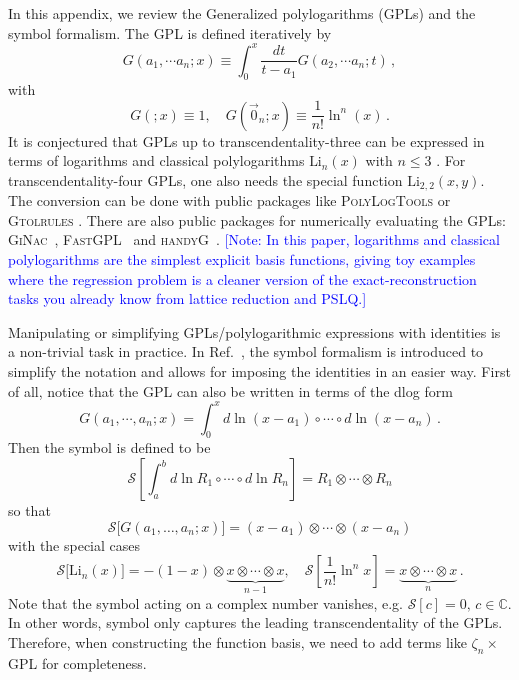 \documentclass[a4paper,11pt]{article}
\makeatletter
\def\textcolor#1#{\kg@textcolor{#1}}
\newcommand{\Li}{\text{Li}}
\newcommand{\cS}{ {\mathcal S} }
\makeatother
\begin{document}
In this appendix, we review the Generalized polylogarithms (GPLs) and the symbol formalism. The GPL is defined iteratively by 
\begin{equation}\label{eq:gpl_def}
G(a_1,\cdots a_n; x)\equiv\int_0^x \frac{dt}{t-a_1} G(a_2,\cdots a_n; t)\,,
\end{equation}
with
\begin{equation}
G(;x)\equiv1,\quad G(\vec 0_n;x)\equiv\frac{1}{n!}\ln^n (x)\,.
\end{equation}
It is conjectured that GPLs up to transcendentality-three can be expressed in terms of logarithms and classical polylogarithms $\Li_n(x)$ with $n\leq 3$ \cite{Duhr:2011zq}. For transcendentality-four GPLs, one also needs the special function $\Li_{2,2}(x,y)$. The conversion can be done with public packages like \textsc{PolyLogTools} \cite{Duhr:2019tlz} or \textsc{Gtolrules} \cite{Frellesvig:2016ske}. There are also public packages for numerically evaluating the GPLs: \textsc{GiNac}~\cite{Bauer:2002, Vollinga:2004sn}, \textsc{FastGPL}~\cite{Wang:2021imw} and \textsc{handyG}~\cite{Naterop:2019xaf}.
\textcolor{blue}{\small [Note: In this paper, logarithms and classical polylogarithms are the simplest explicit basis functions, giving toy examples where the regression problem is a cleaner version of the exact-reconstruction tasks you already know from lattice reduction and PSLQ.]}


Manipulating or simplifying GPLs/polylogarithmic expressions with identities is a non-trivial task in practice. In Ref.~\cite{Goncharov:2010jf}, the symbol formalism is introduced to simplify the notation and allows for imposing the identities in an easier way. First of all, notice that the GPL can also be written in terms of the dlog form
\begin{equation}
      G (a_1, \cdots, a_n ; x) =\int_0^x d \ln (x-a_1) \circ \cdots \circ d \ln (x-a_n) \,.
\end{equation}
Then the symbol is defined to be
\begin{equation}
    \cS\left[\int_a^b d \ln R_1  \circ \cdots \circ d \ln R_n \right]
    =R_1 \otimes \cdots \otimes R_n
\end{equation}
so that
\begin{equation}\label{symbolpolylogs}
  \cS\big[G(a_1,\ldots,a_n;x)\big] = (x-a_1) \otimes \cdots \otimes (x-a_n)
\end{equation}
with the special cases
\begin{equation}\label{symbolpolylogs2}
  \cS\big[\Li_n (x)\big] = - (1 - x) \otimes \underbrace{x \otimes
  \cdots \otimes x}_{n - 1},\quad 
    \mathcal{S} \left[\frac{1}{n!}\ln^n x\right] = \underbrace{x \otimes
  \cdots \otimes x}_{n} \,.
\end{equation}
Note that the symbol acting on a complex number vanishes, e.g.  $\cS[c]=0,\,c\in\mathbb{C}$. In other words, symbol only captures the leading transcendentality of the GPLs. Therefore, when constructing the function basis, we need to add terms like $\zeta_n\times$GPL for completeness.
\end{document}
